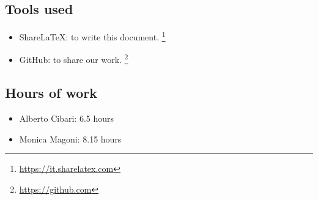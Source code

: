 \subsection*{Tools used}
    \begin{itemize}
        \item ShareLaTeX: to write this document. \footnote{\url{https://it.sharelatex.com}}
        \item GitHub: to share our work. \footnote{\url{https://github.com}} 
    \end{itemize}
\subsection*{Hours of work}
    \begin{itemize}
        \item Alberto Cibari: 6.5 hours
        \item Monica Magoni: 8.15 hours
    \end{itemize}

